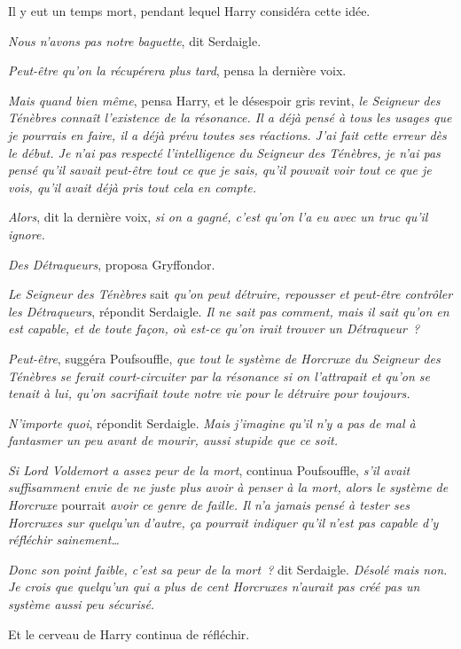 Il y eut un temps mort, pendant lequel Harry considéra cette idée.

\emph{Nous n'avons pas notre baguette}, dit Serdaigle.

\emph{Peut-être qu'on la récupérera plus tard}, pensa la dernière voix.

\emph{Mais quand bien même}, pensa Harry, et le désespoir gris revint, \emph{le Seigneur des Ténèbres connaît l'existence de la résonance. Il a déjà pensé à tous les usages que je pourrais en faire, il a déjà prévu toutes ses réactions. J'ai fait cette erreur dès le début. Je n'ai pas respecté l'intelligence du Seigneur des Ténèbres, je n'ai pas pensé qu'il savait peut-être tout ce que je sais, qu'il pouvait voir tout ce que je vois, qu'il avait déjà pris tout cela en compte.}

\emph{Alors}, dit la dernière voix, \emph{si on a gagné, c'est qu'on l'a eu avec un truc qu'il ignore.}

\emph{Des Détraqueurs}, proposa Gryffondor.

\emph{Le Seigneur des Ténèbres} sait \emph{qu'on peut détruire, repousser et peut-être contrôler les Détraqueurs}, répondit Serdaigle. \emph{Il ne sait pas comment, mais il sait qu'on en est capable, et de toute façon, où est-ce qu'on irait trouver un Détraqueur~?}

\emph{Peut-être}, suggéra Poufsouffle, \emph{que tout le système de Horcruxe du Seigneur des Ténèbres se ferait court-circuiter par la résonance si on l'attrapait et qu'on se tenait à lui, qu'on sacrifiait toute notre vie pour le détruire pour toujours.}

\emph{N'importe quoi}, répondit Serdaigle. \emph{Mais j'imagine qu'il n'y a pas de mal à fantasmer un peu avant de mourir, aussi stupide que ce soit.}

\emph{Si Lord Voldemort a assez peur de la mort}, continua Poufsouffle, \emph{s'il avait suffisamment envie de ne juste plus avoir à penser à la mort, alors le système de Horcruxe} pourrait \emph{avoir ce genre de faille. Il n'a jamais pensé à tester ses Horcruxes sur quelqu'un d'autre, ça pourrait indiquer qu'il n'est pas capable d'y réfléchir sainement…}

\emph{Donc son point faible, c'est sa peur de la mort~?} dit Serdaigle. \emph{Désolé mais non. Je crois que quelqu'un qui a plus de cent Horcruxes n'aurait pas créé pas un système aussi peu sécurisé.}

Et le cerveau de Harry continua de réfléchir.

